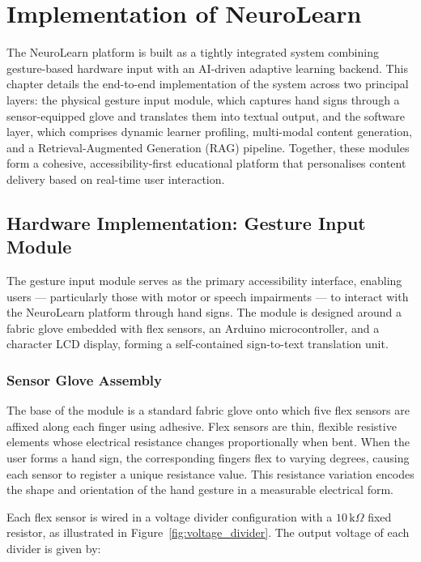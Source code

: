 \chapter{Implementation of NeuroLearn}

The NeuroLearn platform is built as a tightly integrated system combining gesture-based hardware input with an AI-driven adaptive learning backend. This chapter details the end-to-end implementation of the system across two principal layers: the physical gesture input module, which captures hand signs through a sensor-equipped glove and translates them into textual output, and the software layer, which comprises dynamic learner profiling, multi-modal content generation, and a Retrieval-Augmented Generation (RAG) pipeline. Together, these modules form a cohesive, accessibility-first educational platform that personalises content delivery based on real-time user interaction.

\section{Hardware Implementation: Gesture Input Module}

The gesture input module serves as the primary accessibility interface, enabling users — particularly those with motor or speech impairments — to interact with the NeuroLearn platform through hand signs. The module is designed around a fabric glove embedded with flex sensors, an Arduino microcontroller, and a character LCD display, forming a self-contained sign-to-text translation unit.

\subsection{Sensor Glove Assembly}

The base of the module is a standard fabric glove onto which five flex sensors are affixed along each finger using adhesive. Flex sensors are thin, flexible resistive elements whose electrical resistance changes proportionally when bent. When the user forms a hand sign, the corresponding fingers flex to varying degrees, causing each sensor to register a unique resistance value. This resistance variation encodes the shape and orientation of the hand gesture in a measurable electrical form.

Each flex sensor is wired in a voltage divider configuration with a \(10\,\text{k}\Omega\) fixed resistor, as illustrated in Figure~\ref{fig:voltage_divider}. The output voltage of each divider is given by:

